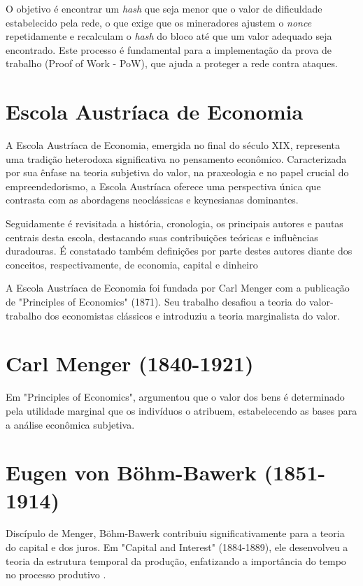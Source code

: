O objetivo é encontrar um \textit{hash} que seja menor que o valor de dificuldade estabelecido pela rede, o que exige que os mineradores ajustem o \textit{nonce} repetidamente e recalculam o \textit{hash} do bloco até que um valor adequado seja encontrado. Este processo é fundamental para a implementação da prova de trabalho (Proof of Work - PoW), que ajuda a proteger a rede contra ataques.

\clearpage
\section{Escola Austríaca de Economia} \label{sec:austriaca}
A Escola Austríaca de Economia, emergida no final do século XIX, representa uma tradição heterodoxa significativa no pensamento econômico. Caracterizada por sua ênfase na teoria subjetiva do valor, na praxeologia e no papel crucial do empreendedorismo, a Escola Austríaca oferece uma perspectiva única que contrasta com as abordagens neoclássicas e keynesianas dominantes. 

Seguidamente é revisitada a história, cronologia, os principais autores e pautas centrais desta escola, destacando suas contribuições teóricas e influências duradouras. É constatado também definições por parte destes autores diante dos conceitos, respectivamente, de economia, capital e dinheiro 


A Escola Austríaca de Economia foi fundada por Carl Menger com a publicação de "Principles of Economics" (1871). Seu trabalho desafiou a teoria do valor-trabalho dos economistas clássicos e introduziu a teoria marginalista do valor.

\section*{Carl Menger (1840-1921)} 
Em "Principles of Economics", \cite{menger1871principles} argumentou que o valor dos bens é determinado pela utilidade marginal que os indivíduos o atribuem, estabelecendo as bases para a análise econômica subjetiva.

\section*{Eugen von Böhm-Bawerk (1851-1914)} 
Discípulo de Menger, Böhm-Bawerk contribuiu significativamente para a teoria do capital e dos juros. Em "Capital and Interest" (1884-1889), ele desenvolveu a teoria da estrutura temporal da produção, enfatizando a importância do tempo no processo produtivo \cite{bohm1884capital}.

